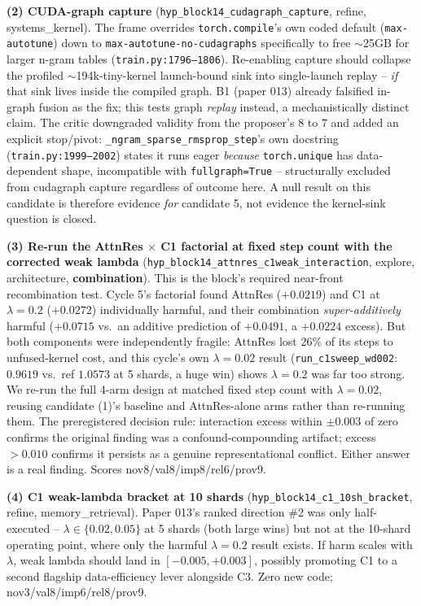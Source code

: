\documentclass{article}
\begin{document}
\textbf{(2) CUDA-graph capture} (\texttt{hyp\_block14\_cudagraph\_capture}, refine, systems\_kernel). The frame overrides \texttt{torch.compile}'s own coded default (\texttt{max-autotune}) down to \texttt{max-autotune-no-cudagraphs} specifically to free $\sim$25GB for larger n-gram tables (\texttt{train.py:1796--1806}). Re-enabling capture should collapse the profiled $\sim$194k-tiny-kernel launch-bound sink into single-launch replay -- \emph{if} that sink lives inside the compiled graph. B1 (paper 013) already falsified in-graph fusion as the fix; this tests graph \emph{replay} instead, a mechanistically distinct claim. The critic downgraded validity from the proposer's 8 to 7 and added an explicit stop/pivot: \texttt{\_ngram\_sparse\_rmsprop\_step}'s own docstring (\texttt{train.py:1999--2002}) states it runs eager \emph{because} \texttt{torch.unique} has data-dependent shape, incompatible with \texttt{fullgraph=True} -- structurally excluded from cudagraph capture regardless of outcome here. A null result on this candidate is therefore evidence \emph{for} candidate 5, not evidence the kernel-sink question is closed.

\textbf{(3) Re-run the AttnRes $\times$ C1 factorial at fixed step count with the corrected weak lambda} (\texttt{hyp\_block14\_attnres\_c1weak\_interaction}, explore, architecture, \textbf{combination}). This is the block's required near-front recombination test. Cycle 5's factorial found AttnRes ($+0.0219$) and C1 at $\lambda=0.2$ ($+0.0272$) individually harmful, and their combination \emph{super-additively} harmful ($+0.0715$ vs.\ an additive prediction of $+0.0491$, a $+0.0224$ excess). But both components were independently fragile: AttnRes lost 26\% of its steps to unfused-kernel cost, and this cycle's own $\lambda=0.02$ result (\texttt{run\_c1sweep\_wd002}: $0.9619$ vs.\ ref $1.0573$ at 5 shards, a huge win) shows $\lambda=0.2$ was far too strong. We re-run the full 4-arm design at matched fixed step count with $\lambda=0.02$, reusing candidate (1)'s baseline and AttnRes-alone arms rather than re-running them. The preregistered decision rule: interaction excess within $\pm0.003$ of zero confirms the original finding was a confound-compounding artifact; excess $>0.010$ confirms it persists as a genuine representational conflict. Either answer is a real finding. Scores nov8/val8/imp8/rel6/prov9.

\textbf{(4) C1 weak-lambda bracket at 10 shards} (\texttt{hyp\_block14\_c1\_10sh\_bracket}, refine, memory\_retrieval). Paper 013's ranked direction \#2 was only half-executed -- $\lambda\in\{0.02,0.05\}$ at 5 shards (both large wins) but not at the 10-shard operating point, where only the harmful $\lambda=0.2$ result exists. If harm scales with $\lambda$, weak lambda should land in $[-0.005,+0.003]$, possibly promoting C1 to a second flagship data-efficiency lever alongside C3. Zero new code; nov3/val8/imp6/rel8/prov9.
\end{document}
